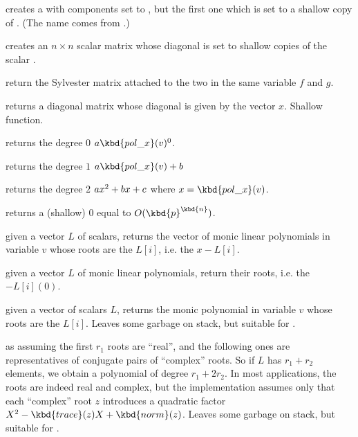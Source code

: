  creates a  with 
components set to , but the first one which is set to a shallow
copy of . (The name comes from .)

 creates an $n\times n$
scalar matrix whose diagonal is set to shallow copies of the scalar .

 return the Sylvester matrix
attached to the two  in the same variable $f$ and $g$.

 returns a diagonal matrix whose diagonal
is given by the vector $x$. Shallow function.

 returns the degree $0$
 $a \kbd{pol\_x}(v)^0$.

 returns the degree $1$
 $a\kbd{pol\_x}(v) + b$

 returns the degree $2$
 $a\*x^2+b\*x+c$ where $x=\kbd{pol\_x}(v)$.

 returns a (shallow) $0$
 equal to $O(\kbd{p}^\kbd{n})$.


 given a vector $L$ of scalars,
returns the vector of monic linear polynomials in variable $v$ whose roots
are the $L[i]$, i.e. the $x - L[i]$.

 given a vector $L$ of monic linear
polynomials, return their roots, i.e. the $- L[i](0)$.

 given a vector of scalars $L$,
returns the monic polynomial in variable $v$ whose roots are the $L[i]$.
Leaves some garbage on stack, but suitable for .

 as 
assuming the first $r_1$ roots are ``real'', and the following ones are
representatives of conjugate pairs of ``complex'' roots. So if $L$ has $r_1 +
r_2$ elements, we obtain a polynomial of degree $r_1 + 2r_2$. In most
applications, the roots are indeed real and complex, but the implementation
assumes only that each ``complex'' root $z$ introduces a quadratic
factor $X^2 - \kbd{trace}(z) X + \kbd{norm}(z)$.
Leaves some garbage on stack, but suitable for .

